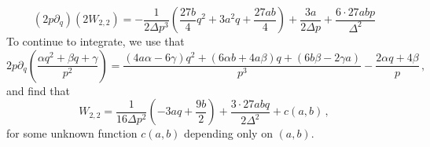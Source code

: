 \documentclass{article}
\theoremstyle{definition}
\numberwithin{equation}{section}
\begin{document}
\begin{equation*}
    (2p\partial_q)(2W_{2,2})=-\frac{1}{2\Delta p^3}\left(\frac{27b}{4}q^2+3a^2q+\frac{27ab}{4}\right)+\frac{3a}{2\Delta p}+\frac{6\cdot 27abp}{\Delta^2}
\end{equation*}
To continue to integrate, we use that 
\begin{equation*}
    2p\partial_q\left(\frac{\alpha q^2+\beta q +\gamma}{p^2}\right)=\frac{(4a\alpha-6\gamma)q^2+(6\alpha b+4a\beta)q+(6b\beta-2\gamma a)}{p^3}-\frac{2\alpha q+4\beta}{p}\,,
\end{equation*}
and find that 
\begin{equation*}
    W_{2,2}=\frac{1}{16\Delta p^2}\left(-3aq+\frac{9b}{2}\right)+\frac{3\cdot 27abq}{2\Delta^2}+c(a,b)\,,
\end{equation*}
for some unknown function $c(a,b)$ depending only on $(a,b)$.\\
\end{document}
